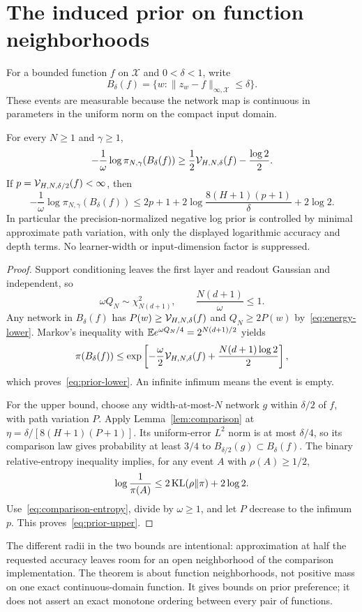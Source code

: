 \section{The induced prior on function neighborhoods}
For a bounded function $f$ on $\mathcal X$ and $0<\delta<1$, write
\[
 B_\delta(f)=\{w:\|z_w-f\|_{\infty,\mathcal X}\le\delta\}.
\]
These events are measurable because the network map is continuous in parameters in the uniform norm on the compact input domain.

\begin{theorem}
\label{thm:prior}
For every $N\ge1$ and $\gamma\ge1$,
\begin{equation}
 -\frac1\omega\log\pi_{N,\gamma}(B_\delta(f))
 \ge\frac12\mathcal V_{H,N,\delta}(f)-\frac{\log2}{2}.
 \label{eq:prior-lower}
\end{equation}
If $p=\mathcal V_{H,N,\delta/2}(f)<\infty$, then
\begin{equation}
 -\frac1\omega\log\pi_{N,\gamma}(B_\delta(f))
 \le2p+1+2\log\frac{8(H+1)(p+1)}\delta+2\log2.
 \label{eq:prior-upper}
\end{equation}
In particular the precision-normalized negative log prior is controlled by minimal approximate path variation, with only the displayed logarithmic accuracy and depth terms. No learner-width or input-dimension factor is suppressed.
\end{theorem}
\begin{proof}
Support conditioning leaves the first layer and readout Gaussian and independent, so
\begin{equation}
 \omega Q_N\sim\chi^2_{N(d+1)},\qquad
 \frac{N(d+1)}\omega\le1.
 \label{eq:chi-square}
\end{equation}
Any network in $B_\delta(f)$ has $P(w)\ge\mathcal V_{H,N,\delta}(f)$ and $Q_N\ge2P(w)$ by~\eqref{eq:energy-lower}. Markov's inequality with
$\mathbb E e^{\omega Q_N/4}=2^{N(d+1)/2}$ yields
\[
 \pi(B_\delta(f))\le
 \exp\left[-\frac\omega2\mathcal V_{H,N,\delta}(f)
                      +\frac{N(d+1)\log2}{2}\right],
\]
which proves~\eqref{eq:prior-lower}. An infinite infimum means the event is empty.

For the upper bound, choose any width-at-most-$N$ network $g$ within $\delta/2$ of $f$, with path variation $P$. Apply Lemma~\ref{lem:comparison} at
$\eta=\delta/[8(H+1)(P+1)]$. Its uniform-error $L^2$ norm is at most $\delta/4$, so its comparison law gives probability at least $3/4$ to $B_{\delta/2}(g)\subset B_\delta(f)$. The binary relative-entropy inequality implies, for any event $A$ with $\rho(A)\ge1/2$,
\[
 \log\frac1{\pi(A)}\le2\operatorname{KL}(\rho\|\pi)+2\log2.
\]
Use~\eqref{eq:comparison-entropy}, divide by $\omega\ge1$, and let $P$ decrease to the infimum $p$. This proves~\eqref{eq:prior-upper}.
\end{proof}

The different radii in the two bounds are intentional: approximation at half the requested accuracy leaves room for an open neighborhood of the comparison implementation. The theorem is about function neighborhoods, not positive mass on one exact continuous-domain function. It gives bounds on prior preference; it does not assert an exact monotone ordering between every pair of functions.
